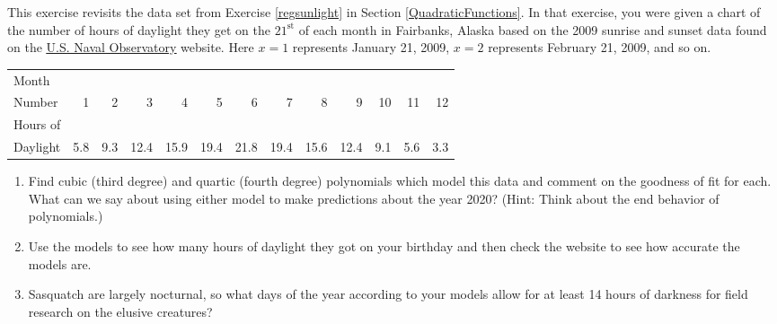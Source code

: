 \documentclass{ximera}
\begin{document}
\begin{problem}\label{sunlighthigherorder} 
This exercise revisits the data set from Exercise \ref{regsunlight} in Section \ref{QuadraticFunctions}.  In that exercise, you were given a chart of the number of hours of daylight they get on the $21^{\mbox{st}}$ of each month in Fairbanks, Alaska based on the 2009 sunrise and sunset data found on the  \href{http://aa.usno.navy.mil/data/docs/RS_OneYear.php}{\underline{U.S. Naval Observatory}} website.  Here  $x = 1$ represents January 21, 2009, $x = 2$ represents February 21, 2009, and so on.  


\small

\noindent \begin{tabular}{|l|r|r|r|r|r|r|r|r|r|r|r|r|} \hline
Month  & & & & & & & & & & & & \\
Number & 1 & 2 & 3 & 4 & 5 & 6 & 7 & 8 & 9 & 10 & 11 & 12\\ 
\hline 
Hours of  & & & & & & & & & & & & \\
Daylight & 5.8 & 9.3 & 12.4 & 15.9 & 19.4 & 21.8 & 19.4 & 15.6 & 12.4 & 9.1 & 5.6 & 3.3 \\ \hline
\end{tabular}


\begin{enumerate}

\item Find cubic (third degree) and quartic (fourth degree) polynomials which model this data and comment on the goodness of fit for each.  What can we say about using either model to make predictions about the year 2020?  (Hint: Think about the end behavior of polynomials.)  

\item Use the models to see how many hours of daylight they got on your birthday and then check the website to see how accurate the models are.  

\item Sasquatch are largely nocturnal, so what days of the year according to your models  allow for at least 14 hours of darkness for field research on the elusive creatures? 

\end{enumerate}
\end{problem}
\end{document}
